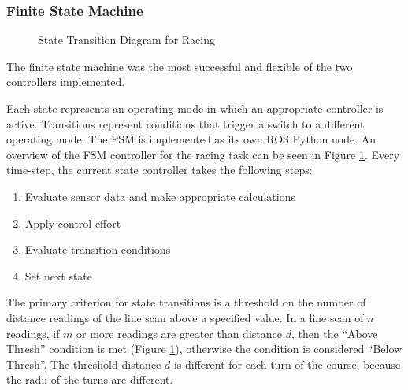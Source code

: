 \documentclass[letterpaper, 10 pt, conference]{ieeeconf}  %
\begin{document}
\subsubsection{Finite State Machine} \label{FSMctrl}

\tikzset{
    ->,
    >=latex,
}

\begin{figure}[t]
    \centering
    \caption{State Transition Diagram for Racing}
    \label{FSMrace}
\end{figure}

The finite state machine was the most successful and flexible of the two controllers implemented.

Each state represents an operating mode in which an appropriate controller is active.  Transitions represent conditions that trigger a switch to a different operating mode.  The FSM is implemented as its own ROS Python node. An overview of the FSM controller for the racing task can be seen in Figure \ref{FSMrace}.  Every time-step, the current state controller takes the following steps:

\begin{enumerate}
    \item Evaluate sensor data and make appropriate calculations
    \item Apply control effort
    \item Evaluate transition conditions 
    \item Set next state
\end{enumerate}

The primary criterion for state transitions is a threshold on the number of distance readings of the line scan above a specified value.  In a line scan of $n$ readings, if $m$ or more readings are greater than distance $d$, then the ``Above Thresh'' condition is met (Figure \ref{FSMrace}), otherwise the condition is considered ``Below Thresh''.  The threshold distance $d$ is different for each turn of the course, because the radii of the turns are different.
\end{document}
